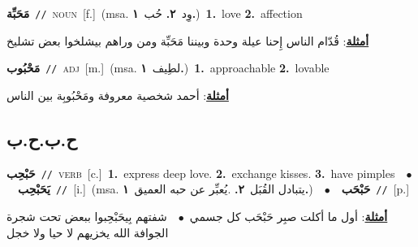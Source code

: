 \documentclass[10pt,a4paper,twoside]{article} %
\begin{document}
\begin{multicols}{2}
{\setlength\topsep{0pt}\textbf{\foreignlanguage{arabic}{مَحَبِّة}}\ {\color{gray}\texttt{//}\color{black}}\ \textsc{noun}\ [f.]\ \color{gray}(msa. \foreignlanguage{arabic}{وِد}~\foreignlanguage{arabic}{\textbf{٢.}}  \foreignlanguage{arabic}{حُب}~\foreignlanguage{arabic}{\textbf{١.}})\color{black}\ \textbf{1.}~love  \textbf{2.}~affection\  \begin{flushright}\color{gray}\foreignlanguage{arabic}{\textbf{\underline{\foreignlanguage{arabic}{أمثلة}}}: قُدّام الناس إِحنا عيلة وحدة وبيننا مَحَبِّة ومن وراهم بيشلخوا بعض تشليخ}\end{flushright}\color{black}} \vspace{2mm}

{\setlength\topsep{0pt}\textbf{\foreignlanguage{arabic}{مَحْبُوب}}\ {\color{gray}\texttt{//}\color{black}}\ \textsc{adj}\ [m.]\ \color{gray}(msa. \foreignlanguage{arabic}{لطِيف}~\foreignlanguage{arabic}{\textbf{١.}})\color{black}\ \textbf{1.}~approachable  \textbf{2.}~lovable\  \begin{flushright}\color{gray}\foreignlanguage{arabic}{\textbf{\underline{\foreignlanguage{arabic}{أمثلة}}}: أحمد شخصية معروفة ومَحْبُوبِة بين الناس}\end{flushright}\color{black}} \vspace{2mm}

\vspace{-3mm}
\subsection*{\color{blue}\foreignlanguage{arabic}{ح.ب.ح.ب}\color{blue}{}} 

{\setlength\topsep{0pt}\textbf{\foreignlanguage{arabic}{حَبْحِب}}\ {\color{gray}\texttt{//}\color{black}}\ \textsc{verb}\ [c.]\ \textbf{1.}~express deep love.  \textbf{2.}~exchange kisses.  \textbf{3.}~have pimples\ \ $\bullet$\ \ \setlength\topsep{0pt}\textbf{\foreignlanguage{arabic}{يَحَبْحِب}}\ {\color{gray}\texttt{//}\color{black}}\ [i.]\ \color{gray}(msa. \foreignlanguage{arabic}{يتبادل القُبَل}~\foreignlanguage{arabic}{\textbf{٢.}}  .\foreignlanguage{arabic}{يُعبِّر عن حبه العميق}~\foreignlanguage{arabic}{\textbf{١.}})\color{black}\ \ $\bullet$\ \ \setlength\topsep{0pt}\textbf{\foreignlanguage{arabic}{حَبْحَب}}\ {\color{gray}\texttt{//}\color{black}}\ [p.]\  \begin{flushright}\color{gray}\foreignlanguage{arabic}{\textbf{\underline{\foreignlanguage{arabic}{أمثلة}}}: أول ما أكلت صبِر حَبْحَب  كل جسمي\ $\bullet$\ \  شفتهم بِيحَبْحِبوا ببعض تحت شجرة الجوافة الله يخزيهم لا حيا ولا خجل}\end{flushright}\color{black}} \vspace{2mm}


\end{multicols}
\end{document}

